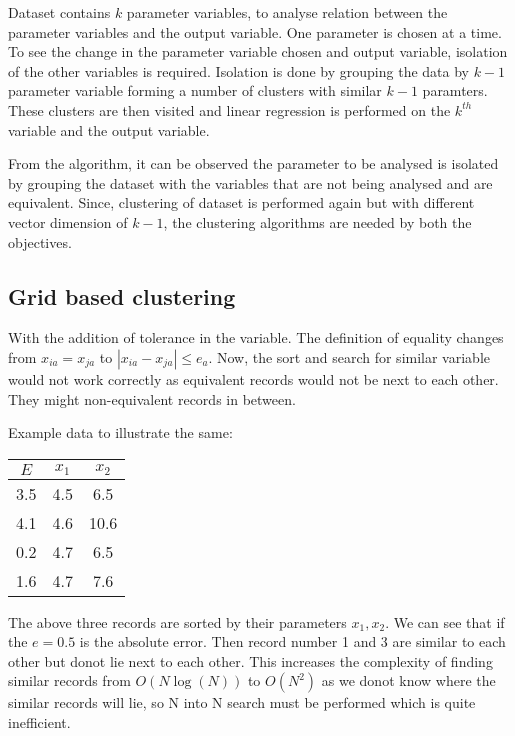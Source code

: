 Dataset contains \(k\) parameter variables, to analyse relation between the parameter variables and the output variable. One parameter is chosen at a time. To see the change in the parameter variable chosen and output variable, isolation of the other variables is required. Isolation is done by grouping the data by \(k-1\) parameter variable forming a number of clusters with similar \(k-1\) paramters. These clusters are then visited and linear regression is performed on the \(k^{th}\) variable and the output variable. 

From the algorithm, it can be observed the parameter to be analysed is isolated by grouping the dataset with the variables that are not being analysed and are equivalent. Since, clustering of dataset is performed again but with different vector dimension of \(k-1\), the clustering algorithms are needed by both the objectives.


\subsection{Grid based clustering}

With the addition of tolerance in the variable. The definition of equality changes from \(x_{ia} = x_{ja}\) to \(|x_{ia} - x_{ja}| \leq e_a\). Now, the sort and search for similar variable would not work correctly as equivalent records would not be next to each other. They might non-equivalent records in between.

Example data to illustrate the same:
\begin{center}
	\begin{tabular}{ | c | c | c |}
		\hline
		\(E\) & \(x_1\) & \(x_2\) \\ \hline
		3.5   & 4.5     & 6.5     \\\hline
		4.1   & 4.6     & 10.6    \\\hline
		0.2   & 4.7     & 6.5     \\\hline
		1.6   & 4.7     & 7.6     \\\hline
		\hline
	\end{tabular}
\end{center}

The above three records are sorted by their parameters \(x_1, x_2\). We can see that if the \(e = 0.5\) is the absolute error. Then record number 1 and 3 are similar to each other but donot lie next to each other. This increases the complexity of finding similar records from \(O(N \log(N))\) to \(O(N^2)\) as we donot know where the similar records will lie, so N into N search must be performed which is quite inefficient.

